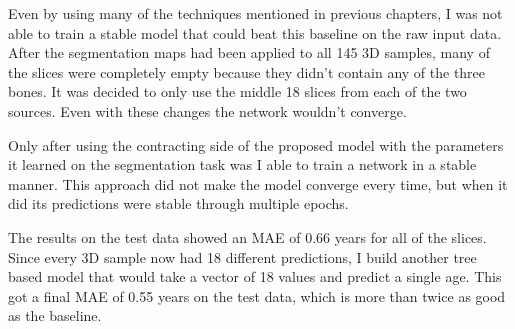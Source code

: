 Even by using many of the techniques mentioned in previous chapters, I was not able to train a stable model that could beat this baseline on the raw input data. After the segmentation maps had been applied to all 145 3D samples, many of the slices were completely empty because they didn't contain any of the three bones. It was decided to only use the middle 18 slices from each of the two sources. Even with these changes the network wouldn't converge.

Only after using the contracting side of the proposed model with the parameters it learned on the segmentation task was I able to train a network in a stable manner. This approach did not make the model converge every time, but when it did its predictions were stable through multiple epochs.

The results on the test data showed an MAE of 0.66 years for all of the slices. Since every 3D sample now had 18 different predictions, I build another tree based model that would take a vector of 18 values and predict a single age. This got a final MAE of 0.55 years on the test data, which is more than twice as good as the baseline.

\newpage